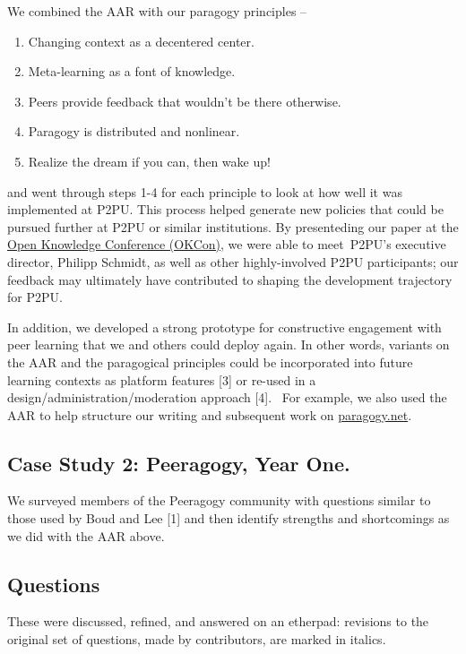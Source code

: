 We combined the AAR with our paragogy principles --
\begin{enumerate}
\itemsep1pt\parskip0pt
\item Changing context as a decentered center.
\item Meta-learning as a font of knowledge.
\item Peers provide feedback that wouldn’t be there otherwise.
\item Paragogy is distributed and nonlinear.
\item Realize the dream if you can, then wake up!
\end{enumerate}
and went through steps 1-4 for each principle to look at how well it
was implemented at P2PU. This process helped generate new policies
that could be pursued further at P2PU or similar institutions.  By
presenteding our paper at the \href{http://okfn.org/okcon/}{Open
  Knowledge Conference (OKCon)}, we were able to meet~P2PU's executive
director, Philipp Schmidt, as well as other highly-involved P2PU
participants; our feedback may ultimately have contributed to shaping
the development trajectory for P2PU.

In addition, we developed a strong prototype for constructive engagement
with peer learning that we and others could deploy again. In other
words, variants on the AAR and the paragogical principles could be
incorporated into future learning contexts as platform features {[}3{]}
or re-used in a design/administration/moderation approach {[}4{]}.~ For
example, we also used the AAR to help structure our writing and
subsequent work on \href{http://paragogy.net}{paragogy.net}.

\subsection{Case Study 2: Peeragogy, Year One.}

We surveyed members of the Peeragogy community with questions similar
to those used by Boud and Lee {[}1{]} and then identify strengths and
shortcomings as we did with the AAR above. 

\subsection{Questions}

These were discussed, refined, and answered on an etherpad: revisions
to the original set of questions, made by contributors, are marked in
italics.

